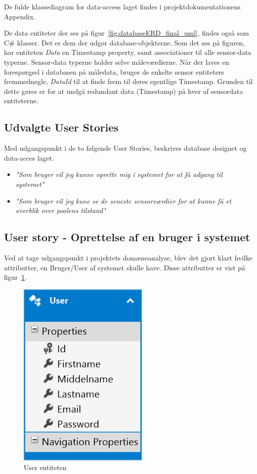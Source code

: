 De fulde klassediagram for data-access laget findes i projektdokumentationens Appendix.

De data entiteter der ses på figur~\ref{fig:databaseERD_final_uml}, findes også som C\# klasser. Det er dem der udgør database-objekterne. Som det ses på figuren, har entiteten \textit{Data} en Timestamp property, samt associationer til alle sensor-data typerne. Sensor-data typerne holder selve måleværdierne. Når der laves en forespørgsel i databasen på måledata, bruges de enkelte sensor entiteters fremmednøgle, \textit{DataId} til at finde frem til deres egentlige Timestamp. Grunden til dette gøres er for at undgå redundant data (Timestamp) på hver af sensordata entiteterne.

\subsection{Udvalgte User Stories}
Med udgangspunkt i de to følgende User Stories, beskrives database designet og data-acces laget. 

\begin{itemize}
	\item \textit{"Som bruger vil jeg kunne oprette mig i systemet for at få adgang til systemet"}
	\item \textit{"Som bruger vil jeg kune se de seneste sensorværdier for at kunne få et overblik over poolens tilstand"}
\end{itemize}

\subsection{User story - Oprettelse af en bruger i systemet}

Ved at tage udgangspunkt i projektets domæneanalyse, blev det gjort klart hvilke attributter, en Bruger/User af systemet skulle have. Disse attributter er vist på figur~\ref{fig:database_model_1}.

\begin{figure}[h]
\centering
\includegraphics[width=0.2\linewidth]{figs/database/database_model_1.png}
\caption{User entiteten}
\label{fig:database_model_1}
\end{figure}


